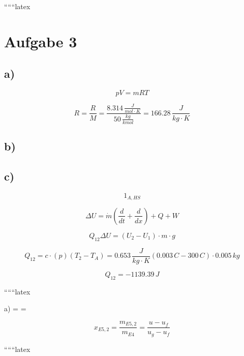 
``````latex


\section*{Aufgabe 3}

\subsection*{a)}
\begin{equation*}
pV = mRT
\end{equation*}

\begin{equation*}
R = \frac{R}{M} = \frac{8.314 \, \frac{J}{mol \cdot K}}{50 \, \frac{kg}{kmol}} = 166.28 \, \frac{J}{kg \cdot K}
\end{equation*}

\subsection*{b)}

\subsection*{c)}
\begin{equation*}
1_{A,HS}
\end{equation*}

\begin{equation*}
\Delta U = \dot{m} \left( \frac{d}{dt} + \frac{d}{dx} \right) + Q + W
\end{equation*}

\begin{equation*}
Q_{12} \Delta U = (U_2 - U_1) \cdot m \cdot g
\end{equation*}

\begin{equation*}
Q_{12} = c \cdot (p) \left( T_2 - T_A \right) = 0.653 \, \frac{J}{kg \cdot K} \left( 0.003 \, C - 300 \, C \right) \cdot 0.005 \, kg
\end{equation*}

\begin{equation*}
Q_{12} = -1139.39 \, J
\end{equation*}

``````latex


a) \quad {} =  \quad \Rightarrow \quad {} = 

\[
x_{E5,2} = \frac{m_{E5,2}}{m_{E4}} = \frac{u - u_f}{u_g - u_f}
\]

``````latex


